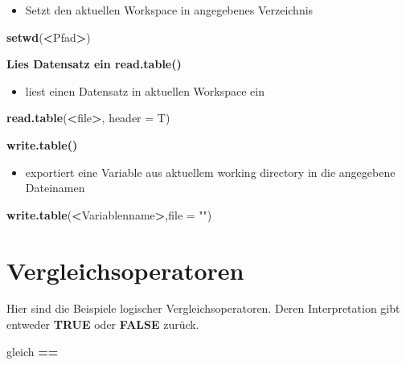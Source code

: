 \documentclass[]{book}
\newenvironment{Shaded}{\begin{snugshade}}{\end{snugshade}}
\newcommand{\KeywordTok}[1]{\textcolor[rgb]{0.13,0.29,0.53}{\textbf{#1}}}
\newcommand{\DataTypeTok}[1]{\textcolor[rgb]{0.13,0.29,0.53}{#1}}
\newcommand{\StringTok}[1]{\textcolor[rgb]{0.31,0.60,0.02}{#1}}
\newcommand{\OperatorTok}[1]{\textcolor[rgb]{0.81,0.36,0.00}{\textbf{#1}}}
\newcommand{\NormalTok}[1]{#1}
\providecommand{\tightlist}{%
  \setlength{\itemsep}{0pt}\setlength{\parskip}{0pt}}
\begin{document}
\begin{itemize}
\tightlist
\item
  Setzt den aktuellen Workspace in angegebenes Verzeichnis
\end{itemize}

\begin{Shaded}
\begin{Highlighting}[]
\KeywordTok{setwd}\NormalTok{(}\OperatorTok{<}\NormalTok{Pfad}\OperatorTok{>}\NormalTok{)}
\end{Highlighting}
\end{Shaded}

\textbf{Lies Datensatz ein read.table()}

\begin{itemize}
\tightlist
\item
  liest einen Datensatz in aktuellen Workspace ein
\end{itemize}

\begin{Shaded}
\begin{Highlighting}[]
\KeywordTok{read.table}\NormalTok{(}\OperatorTok{<}\NormalTok{file}\OperatorTok{>}\NormalTok{, }\DataTypeTok{header =}\NormalTok{ T)}
\end{Highlighting}
\end{Shaded}

\textbf{write.table()}

\begin{itemize}
\tightlist
\item
  exportiert eine Variable aus aktuellem working directory in die
  angegebene Dateinamen
\end{itemize}

\begin{Shaded}
\begin{Highlighting}[]
\KeywordTok{write.table}\NormalTok{(}\OperatorTok{<}\NormalTok{Variablenname}\OperatorTok{>}\NormalTok{,}\DataTypeTok{file =} \StringTok{""}\NormalTok{)}
\end{Highlighting}
\end{Shaded}

\section{Vergleichsoperatoren}\label{vergleichsoperatoren}

Hier sind die Beispiele logischer Vergleichsoperatoren. Deren
Interpretation gibt entweder \textbf{TRUE} oder \textbf{FALSE} zurück.

gleich \textbf{==}
\end{document}
